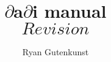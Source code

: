 \documentclass{report}
\newcommand{\dadi}{$\partial$a$\partial$i\xspace}
\begin{document}
\title{\dadi manual\\\normalsize $Revision$}
\author{Ryan Gutenkunst}
\maketitle
\end{document}

